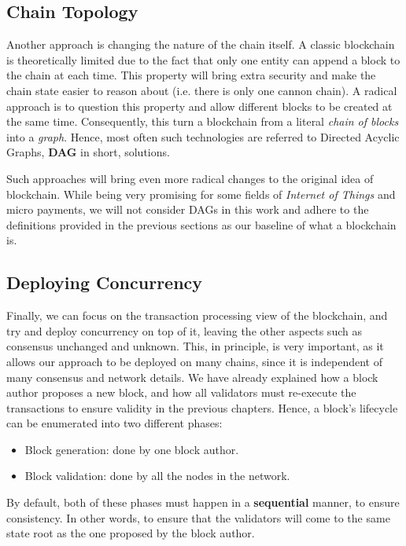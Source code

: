 \subsection{Chain Topology}

Another approach is changing the nature of the chain itself. A classic blockchain is
theoretically limited due to the fact that only one entity can append a block to the chain at each time.
This property will bring extra security and make the chain state easier to reason about (i.e. there
is only one cannon chain). A radical approach is to question this property and allow different
blocks to be created at the same time. Consequently, this turn a blockchain from a literal
\textit{chain of blocks} into a \textit{graph}. Hence, most often such technologies are
referred to Directed Acyclic Graphs, \textbf{DAG} in short, solutions.

Such approaches will bring even more radical changes to the original idea of blockchain. While being
very promising for some fields of \textit{Internet of Things} and micro payments, we will not
consider DAGs in this work and adhere to the definitions provided in the previous sections as our
baseline of what a blockchain is.

\subsection{Deploying Concurrency}

Finally, we can focus on the transaction processing view of the blockchain, and try and deploy
concurrency on top of it, leaving the other aspects such as consensus unchanged and unknown. This,
in principle, is very important, as it allows our approach to be deployed on many chains, since it
is independent of many consensus and network details. We have already explained how a block author
proposes a new block, and how all validators must re-execute the transactions to ensure validity in
the previous chapters. Hence, a block's lifecycle can be enumerated into two different phases:

\begin{itemize}
	\item Block generation: done by one block author.
	\item Block validation: done by all the nodes in the network.
\end{itemize}

By default, both of these phases must happen in a \textbf{sequential} manner, to ensure consistency.
In other words, to ensure that the validators will come to the same state root as the one proposed
by the block author.

